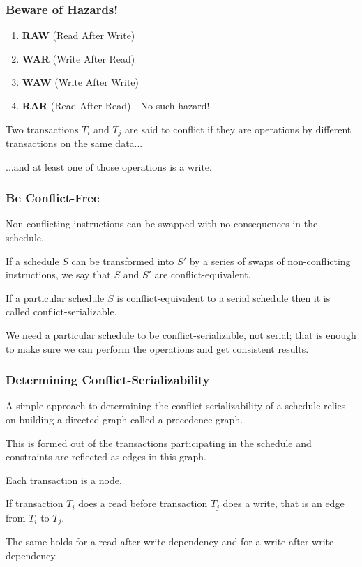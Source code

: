 \begin{frame}
\frametitle{Beware of Hazards!}

\begin{enumerate}
	\item \textbf{RAW} (Read After Write)
	\item \textbf{WAR} (Write After Read)
	\item \textbf{WAW} (Write After Write)
	\item \textbf{RAR} (Read After Read) - No such hazard! 
\end{enumerate}

Two transactions $T_{i}$ and $T_{j}$ are said to \alert{conflict} if they are operations by different transactions on the same data... 

...and at least one of those operations is a write.

\end{frame}

\begin{frame}
\frametitle{Be Conflict-Free}

Non-conflicting instructions can be swapped with no consequences in the schedule. 

If a schedule $S$ can be transformed into $S'$ by a series of swaps of non-conflicting instructions, we say that $S$ and $S'$ are conflict-equivalent.

If a particular schedule $S$ is conflict-equivalent to a serial schedule then it is called conflict-serializable.

We need a particular schedule to be conflict-serializable, not serial; that is enough to make sure we can perform the operations and get consistent results.

\end{frame}

\begin{frame}
\frametitle{Determining Conflict-Serializability}

A simple approach to determining the conflict-serializability of a schedule relies on building a directed graph called a precedence graph. 

This is formed out of the transactions participating in the schedule and constraints are reflected as edges in this graph. 

Each transaction is a node. 

If transaction $T_{i}$ does a read before transaction $T_{j}$ does a write, that is an edge from $T_{i}$ to $T_{j}$. 

The same holds for a read after write dependency and for a write after write dependency. 

\end{frame}



